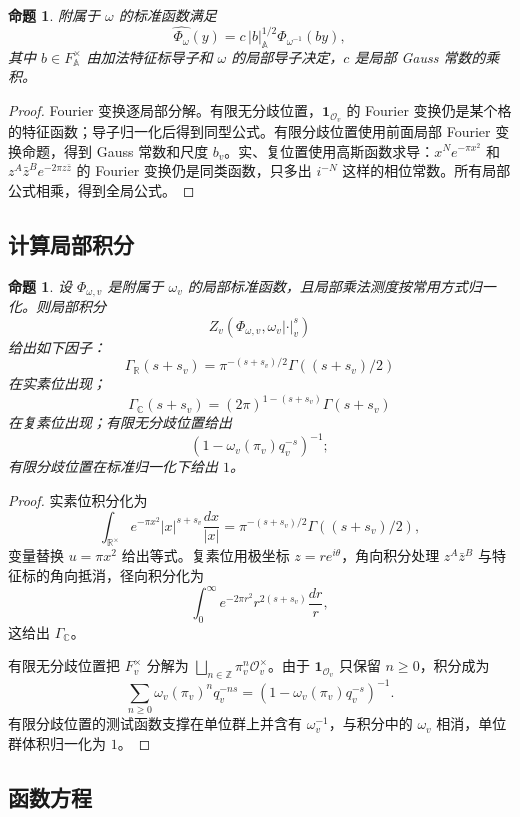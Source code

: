 \documentclass[11pt,a4paper,openany]{ctexbook}
\numberwithin{equation}{chapter}
\newcommand{\R}{\mathbb{R}}
\newcommand{\C}{\mathbb{C}}
\newcommand{\Z}{\mathbb{Z}}
\newcommand{\A}{\mathbb{A}}
\theoremstyle{plain}
\newtheorem{proposition}[theorem]{命题}
\theoremstyle{definition}
\theoremstyle{remark}
\begin{document}
\begin{proposition}
附属于 $\omega$ 的标准函数满足
\[
  \widehat{\Phi_\omega}(y)=c\,|b|_{\A}^{1/2}\Phi_{\omega^{-1}}(by),
\]
其中 $b\in F_{\A}^{\times}$ 由加法特征标导子和 $\omega$ 的局部导子决定，$c$ 是局部 Gauss 常数的乘积。
\end{proposition}

\begin{proof}
Fourier 变换逐局部分解。有限无分歧位置，$\mathbf 1_{\mathcal O_v}$ 的 Fourier 变换仍是某个格的特征函数；导子归一化后得到同型公式。有限分歧位置使用前面局部 Fourier 变换命题，得到 Gauss 常数和尺度 $b_v$。实、复位置使用高斯函数求导：$x^Ne^{-\pi x^2}$ 和 $z^A\bar z^Be^{-2\pi z\bar z}$ 的 Fourier 变换仍是同类函数，只多出 $i^{-N}$ 这样的相位常数。所有局部公式相乘，得到全局公式。
\end{proof}

\subsection{计算局部积分}

\begin{proposition}
设 $\Phi_{\omega,v}$ 是附属于 $\omega_v$ 的局部标准函数，且局部乘法测度按常用方式归一化。则局部积分
\[
  Z_v(\Phi_{\omega,v},\omega_v|\cdot|_v^s)
\]
给出如下因子：
\[
  \Gamma_{\R}(s+s_v)=\pi^{-(s+s_v)/2}\Gamma((s+s_v)/2)
\]
在实素位出现；
\[
  \Gamma_{\C}(s+s_v)=(2\pi)^{1-(s+s_v)}\Gamma(s+s_v)
\]
在复素位出现；有限无分歧位置给出
\[
  (1-\omega_v(\pi_v)q_v^{-s})^{-1};
\]
有限分歧位置在标准归一化下给出 $1$。
\end{proposition}

\begin{proof}
实素位积分化为
\[
  \int_{\R^\times}e^{-\pi x^2}|x|^{s+s_v}\frac{dx}{|x|}
  =
  \pi^{-(s+s_v)/2}\Gamma((s+s_v)/2),
\]
变量替换 $u=\pi x^2$ 给出等式。复素位用极坐标 $z=re^{i\theta}$，角向积分处理 $z^A\bar z^B$ 与特征标的角向抵消，径向积分化为
\[
  \int_0^\infty e^{-2\pi r^2}r^{2(s+s_v)}\frac{dr}{r},
\]
这给出 $\Gamma_{\C}$。

有限无分歧位置把 $F_v^\times$ 分解为 $\bigsqcup_{n\in\Z}\pi_v^n\mathcal O_v^\times$。由于 $\mathbf 1_{\mathcal O_v}$ 只保留 $n\ge0$，积分成为
\[
  \sum_{n\ge0}\omega_v(\pi_v)^nq_v^{-ns}
  =
  (1-\omega_v(\pi_v)q_v^{-s})^{-1}.
\]
有限分歧位置的测试函数支撑在单位群上并含有 $\omega_v^{-1}$，与积分中的 $\omega_v$ 相消，单位群体积归一化为 $1$。
\end{proof}

\subsection{函数方程}
\end{document}
